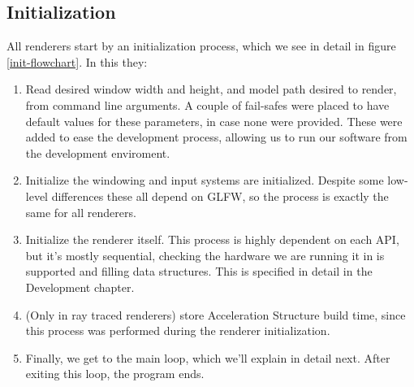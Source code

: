 \subsection{Initialization}
All renderers start by an initialization process, which we see in detail in figure \ref{init-flowchart}. In this they: 
\begin{enumerate}
\item Read desired window width and height, and model path desired to render, from command line arguments. A couple of fail-safes were placed to have default values for these parameters, in case none were provided. These were added to ease the development process, allowing us to run our software from the development enviroment. 
\item Initialize the windowing and input systems are initialized. Despite some low-level differences these all depend on GLFW, so the process is exactly the same for all renderers.
\item Initialize the renderer itself. This process is highly dependent on each API, but it's mostly sequential, checking the hardware we are running it in is supported and filling data structures. This is specified in detail in the Development chapter.
\item (Only in ray traced renderers) store Acceleration Structure build time, since this process was performed during the renderer initialization.
\item Finally, we get to the main loop, which we'll explain in detail next. After exiting this loop, the program ends.
\end{enumerate}

